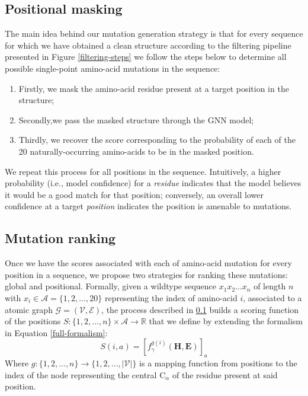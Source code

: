 \subsection{Positional masking}
\label{positional-masking}
The main idea behind our mutation generation strategy is that for every sequence for which we have obtained a clean structure according to the filtering pipeline presented in Figure \ref{filtering-steps} we follow the steps below to determine all possible single-point amino-acid mutations in the sequence:
\begin{enumerate}
    \item Firstly, we mask the amino-acid residue present at a target position in the structure; 
    \item Secondly,we pass the masked structure through the GNN model; 
    \item Thirdly, we recover the score corresponding to the probability of each of the 20 naturally-occurring amino-acids to be in the masked position. 
\end{enumerate}
We repeat this process for all positions in the sequence. 
Intuitively, a higher probability (i.e., model confidence) for a \textit{residue} indicates that the model believes it would be a good match for that position; conversely, an overall lower confidence at a target \textit{position} indicates the position is amenable to mutations.

\subsection{Mutation ranking}
Once we have the scores associated with each of amino-acid mutation for every position in a sequence, we propose two strategies for ranking these mutations: global and positional. Formally, given a wildtype sequence $x_1x_2\dots x_n$ of length $n$ with $x_i \in \mathcal{A} = \{1,2,\dots,20\}$ representing the index of amino-acid $i$, associated to a atomic graph $\mathcal{G} = (\mathcal{V}, \mathcal{E})$, the process described in \ref{positional-masking} builds a scoring function of the positions  $S:\{1,2,\dots,n\}\times\mathcal{A}\rightarrow \mathbb{R}$ that we define by extending the formalism in Equation \ref{full-formalism}:
\begin{equation}
    S(i, a) = [f_{\gamma}^{g(i)}(\mathbf{H}, \mathbf{E})]_a
\label{scoring-function}
\end{equation}
Where $g:\{1,2,\dots,n\}\rightarrow\{1,2,\dots,|\mathcal{V}|\}$ is a mapping function from positions to the index of the node representing the central $\text{C}_{\alpha}$ of the residue present at said position. 

